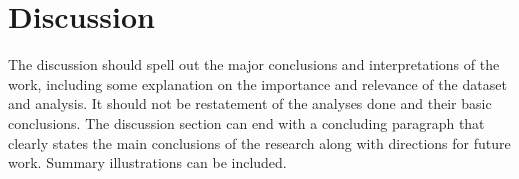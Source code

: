 \documentclass[a4paper,num-refs]{oup-contemporary}
\begin{document}
\section{Discussion}

The discussion should spell out the major conclusions and interpretations of the work, including some explanation on the importance and relevance of the dataset and analysis. It should not be restatement of the analyses done and their basic conclusions. The discussion section can end with a concluding paragraph that clearly states the main conclusions of the research along with directions for future work. Summary illustrations can be included.

\end{document}
